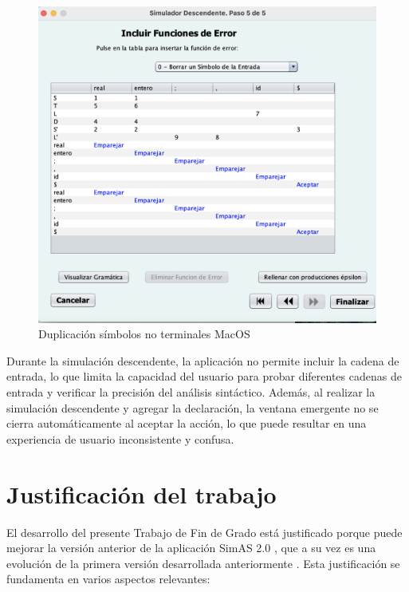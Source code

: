 \begin{figure}[htp]
 	\begin{center}
      \includegraphics[scale=0.5]{figuras/Cap3/SimAS2/fallos/macos2.png} 
       \caption{Duplicación símbolos no terminales MacOS}\label{fig:SimAS-2.0-macos2}
 	\end{center}
\end{figure}

Durante la simulación descendente, la aplicación no permite incluir la cadena de entrada, lo que limita la capacidad del usuario para probar diferentes cadenas de entrada y verificar la precisión del análisis sintáctico. Además, al realizar la simulación descendente y agregar la declaración, la ventana emergente no se cierra automáticamente al aceptar la acción, lo que puede resultar en una experiencia de usuario inconsistente y confusa.


\section{Justificación del trabajo} \label{sec:justificacion}

El desarrollo del presente Trabajo de Fin de Grado está justificado porque puede mejorar la versión anterior de la aplicación SimAS 2.0 \cite{juan}, que a su vez es una evolución de la primera versión desarrollada anteriormente \cite{vanesa}. Esta justificación se fundamenta en varios aspectos relevantes:

